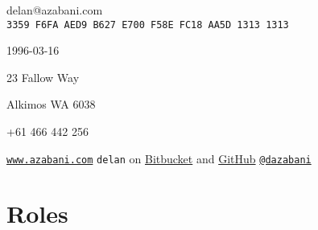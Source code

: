 \documentclass[a4paper,12pt]{article}
\begin{document}
\hrulefill

\hspace{5mm}\begin{minipage}{110mm}
	                    {\Huge{delan\textcolor{lg}{@}azabani\textcolor{lg}{.com}}}
	\vspace{0.5em}  \\  {\texttt{\textcolor{lg}{3359 F6FA AED9 B627 E700 F58E FC18 AA5D 1313 1313}}}
\end{minipage}\hfill\begin{minipage}{50mm}
	\hfill  1996-03-16             \par
	\hfill  23 Fallow Way          \par
	\hfill  Alkimos WA 6038        \par
	\hfill  +61 466 442 256        \par
\end{minipage}\hspace{5mm}

\hrulefill

\vspace{-1ex}\hspace{5mm}\begin{minipage}{160mm}%
	\texttt{\href{https://www.azabani.com/}{www.azabani.com}}
	\hfill
	\texttt{delan} on
	\href{https://bitbucket.org/delan/}{Bitbucket} and
	\href{https://github.com/delan}{GitHub}
	\hfill
	\texttt{\href{https://twitter.com/dazabani}{@dazabani}}
\end{minipage}\hspace{5mm}\vspace{-2ex}

\hrulefill

\section*{Roles}
\end{document}
